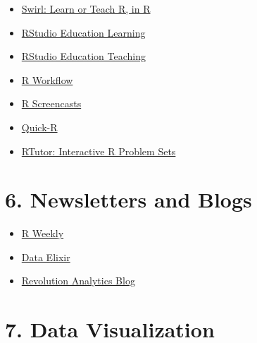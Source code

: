 \documentclass[
  letterpaper,
  DIV=11,
  numbers=noendperiod]{scrreprt}
\providecommand{\tightlist}{%
  \setlength{\itemsep}{0pt}\setlength{\parskip}{0pt}}\usepackage{longtable,booktabs,array}
\begin{document}
\begin{itemize}
\tightlist
\item
  \href{https://swirlstats.com/}{Swirl: Learn or Teach R, in R}
\item
  \href{https://education.rstudio.com/learn/}{RStudio Education
  Learning}
\item
  \href{https://education.rstudio.com/teach/}{RStudio Education
  Teaching}
\item
  \href{https://hbiostat.org/rflow/}{R Workflow}
\item
  \href{https://www.rscreencasts.com/}{R Screencasts}
\item
  \href{https://www.statmethods.net/}{Quick-R}
\item
  \href{https://skranz.github.io/RTutor/}{RTutor: Interactive R Problem
  Sets}
\end{itemize}

\hypertarget{newsletters-and-blogs}{%
\section*{6. Newsletters and Blogs}\label{newsletters-and-blogs}}


\begin{itemize}
\tightlist
\item
  \href{https://rweekly.org/}{R Weekly}
\item
  \href{https://dataelixir.com/}{Data Elixir}
\item
  \href{https://blog.revolutionanalytics.com/}{Revolution Analytics
  Blog}
\end{itemize}

\hypertarget{data-visualization}{%
\section*{7. Data Visualization}\label{data-visualization}}

\end{document}
